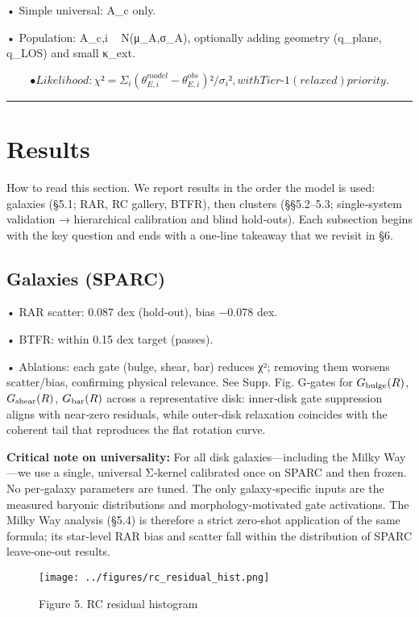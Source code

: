 \documentclass[11pt,a4paper]{article}
\begin{document}
• Simple universal: A\_c only.  

• Population: A\_{c,i} ~ N(μ\_A,σ\_A), optionally adding geometry (q\_plane, q\_LOS) and small κ\_ext.  

\[
• Likelihood: χ² = Σ_i (θ_{E,i}^{model}−θ_{E,i}^{obs})²/σ_i², with Tier‑1 (relaxed) priority.
\]


\medskip\hrule\medskip


\section{Results}


How to read this section. We report results in the order the model is used: galaxies (§5.1; RAR, RC gallery, BTFR), then clusters (§§5.2–5.3; single‑system validation → hierarchical calibration and blind hold‑outs). Each subsection begins with the key question and ends with a one‑line takeaway that we revisit in §6.


\subsection{Galaxies (SPARC)}


• RAR scatter: 0.087 dex (hold‑out), bias −0.078 dex.  

• BTFR: within 0.15 dex target (passes).  

• Ablations: each gate (bulge, shear, bar) reduces χ²; removing them worsens scatter/bias, confirming physical relevance. See Supp. Fig. G‑gates for $G_{\rm bulge}(R)$, $G_{\rm shear}(R)$, $G_{\rm bar}(R)$ across a representative disk: inner‑disk gate suppression aligns with near‑zero residuals, while outer‑disk relaxation coincides with the coherent tail that reproduces the flat rotation curve.


\textbf{Critical note on universality:} For all disk galaxies—including the Milky Way—we use a single, universal Σ‑kernel calibrated once on SPARC and then frozen. No per‑galaxy parameters are tuned. The only galaxy‑specific inputs are the measured baryonic distributions and morphology‑motivated gate activations. The Milky Way analysis (§5.4) is therefore a strict zero‑shot application of the same formula; its star‑level RAR bias and scatter fall within the distribution of SPARC leave‑one‑out results.


\begin{figure}[h]
\centering
\texttt{[image: ../figures/rc\_residual\_hist.png]}
\caption{Figure 5. RC residual histogram}
\end{figure}
\end{document}
